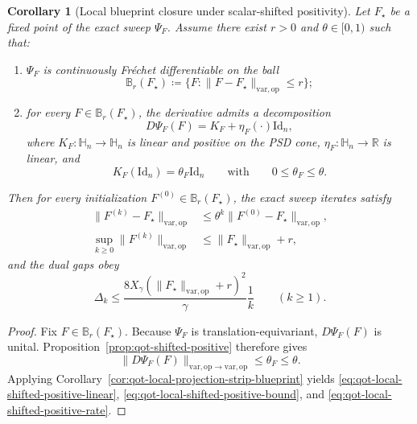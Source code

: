 \documentclass[11pt]{article}
\newcommand{\RR}{\mathbb{R}}
\newcommand{\Id}{\mathrm{Id}}
\newcommand{\eqdef}{\coloneqq}
\newcommand{\Hh}{\mathbb{H}}
\newcommand{\op}{\mathrm{op}}
\newcommand{\varop}{\mathrm{var},\op}
\theoremstyle{plain}
\newtheorem{corollary}[proposition]{Corollary}
\begin{document}
\begin{corollary}[Local blueprint closure under scalar-shifted positivity]
\label{cor:qot-local-shifted-positive-blueprint}
Let $F_\star$ be a fixed point of the exact sweep $\Psi_F$.
Assume there exist $r>0$ and $\theta\in[0,1)$ such that:
\begin{enumerate}[label=\textnormal{(\roman*)}]
\item $\Psi_F$ is continuously Fr\'echet differentiable on the ball
\[
\mathbb B_r(F_\star)
\eqdef
\{F : \|F-F_\star\|_{\varop}\le r\};
\]
\item for every $F\in \mathbb B_r(F_\star)$, the derivative admits a decomposition
\[
D\Psi_F(F)=K_F+\eta_F(\cdot)\Id_n,
\]
where $K_F:\Hh_n\to\Hh_n$ is linear and positive on the PSD cone, $\eta_F:\Hh_n\to\RR$ is linear, and
\[
K_F(\Id_n)=\theta_F\Id_n
\qquad\text{with}\qquad
0\le \theta_F\le \theta.
\]
\end{enumerate}
Then for every initialization $F^{(0)}\in \mathbb B_r(F_\star)$, the exact sweep iterates satisfy
\begin{align}
\|F^{(k)}-F_\star\|_{\varop}
&\le
\theta^k\|F^{(0)}-F_\star\|_{\varop},
\label{eq:qot-local-shifted-positive-linear}\\
\sup_{k\ge 0}\|F^{(k)}\|_{\varop}
&\le
\|F_\star\|_{\varop}+r,
\label{eq:qot-local-shifted-positive-bound}
\end{align}
and the dual gaps obey
\begin{equation}
\label{eq:qot-local-shifted-positive-rate}
\Delta_k
\le
\frac{8X_\gamma(\|F_\star\|_{\varop}+r)^2}{\gamma}\frac{1}{k}
\qquad (k\ge 1).
\end{equation}
\end{corollary}

\begin{proof}
Fix $F\in \mathbb B_r(F_\star)$.
Because $\Psi_F$ is translation-equivariant, $D\Psi_F(F)$ is unital.
Proposition~\ref{prop:qot-shifted-positive} therefore gives
\[
\|D\Psi_F(F)\|_{\varop\to\varop}\le \theta_F\le \theta.
\]
Applying Corollary~\ref{cor:qot-local-projection-strip-blueprint} yields
\eqref{eq:qot-local-shifted-positive-linear},
\eqref{eq:qot-local-shifted-positive-bound}, and
\eqref{eq:qot-local-shifted-positive-rate}.
\end{proof}
\end{document}
